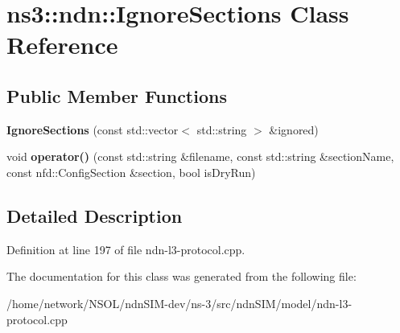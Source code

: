 \hypertarget{classns3_1_1ndn_1_1IgnoreSections}{}\section{ns3\+:\+:ndn\+:\+:Ignore\+Sections Class Reference}
\label{classns3_1_1ndn_1_1IgnoreSections}
\subsection*{Public Member Functions}
\begin{DoxyCompactItemize}
\item 
{\bfseries Ignore\+Sections} (const std\+::vector$<$ std\+::string $>$ \&ignored)\hypertarget{classns3_1_1ndn_1_1IgnoreSections_afe1818381c1d0f149efa0b50e8c94693}{}\label{classns3_1_1ndn_1_1IgnoreSections_afe1818381c1d0f149efa0b50e8c94693}

\item 
void {\bfseries operator()} (const std\+::string \&filename, const std\+::string \&section\+Name, const nfd\+::\+Config\+Section \&section, bool is\+Dry\+Run)\hypertarget{classns3_1_1ndn_1_1IgnoreSections_a7840337ecdca147641cd971d7953c793}{}\label{classns3_1_1ndn_1_1IgnoreSections_a7840337ecdca147641cd971d7953c793}

\end{DoxyCompactItemize}


\subsection{Detailed Description}


Definition at line 197 of file ndn-\/l3-\/protocol.\+cpp.



The documentation for this class was generated from the following file\+:\begin{DoxyCompactItemize}
\item 
/home/network/\+N\+S\+O\+L/ndn\+S\+I\+M-\/dev/ns-\/3/src/ndn\+S\+I\+M/model/ndn-\/l3-\/protocol.\+cpp\end{DoxyCompactItemize}
